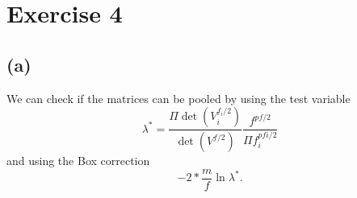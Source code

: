 
\section*{Exercise 4}
\label{sec:exercise-4}

\subsection*{(a)}
\label{sec:a-3}

We can check if the matrices can be pooled by using the test variable
\begin{equation*}
  \lambda^* = \frac{\Pi \det(V_i ^{f_i/2})}{\det(V^{f/2})}
  \frac{f^{pf/2}}{\Pi f_i ^{pfi/2}}
\end{equation*}
and using the Box correction
\begin{equation*}
  -2 * \frac{m}{f} \ln \lambda^*.
\end{equation*}


